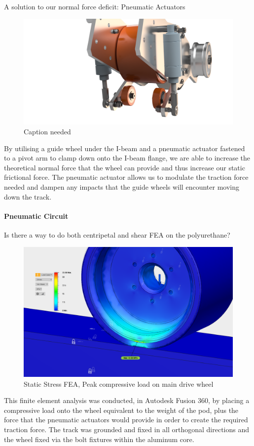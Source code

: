 \documentclass[main.tex]{subfiles}
\begin{document}
    A solution to our normal force deficit: Pneumatic Actuators
    \begin{figure}[H]
        \centering
        \includegraphics[width=\linewidth]{images/fig20}
        \caption{Caption needed}
    \end{figure}
    By utilising a guide wheel under the I-beam and a pneumatic actuator fastened to a pivot arm to clamp down onto the I-beam flange, we are able to increase the theoretical normal force that the wheel can provide and thus increase our static frictional force. The pneumatic actuator allows us to modulate the traction force needed and dampen any impacts that the guide wheels will encounter moving down the track.

    \paragraph{Pneumatic Circuit}
    Is there a way to do both centripetal and shear FEA on the polyurethane?\\
    \begin{figure}[H]
        \centering
        \includegraphics[width=\linewidth]{images/fig21}
        \caption{Static Stress FEA, Peak compressive load on main drive wheel}
    \end{figure}
    This finite element analysis was conducted, in Autodesk Fusion 360, by placing a compressive load onto the wheel equivalent to the weight of the pod, plus the force that the pneumatic actuators would provide in order to create the required traction force. The track was grounded and fixed in all orthogonal directions and the wheel fixed via the bolt fixtures within the aluminum core.\\
\end{document}
